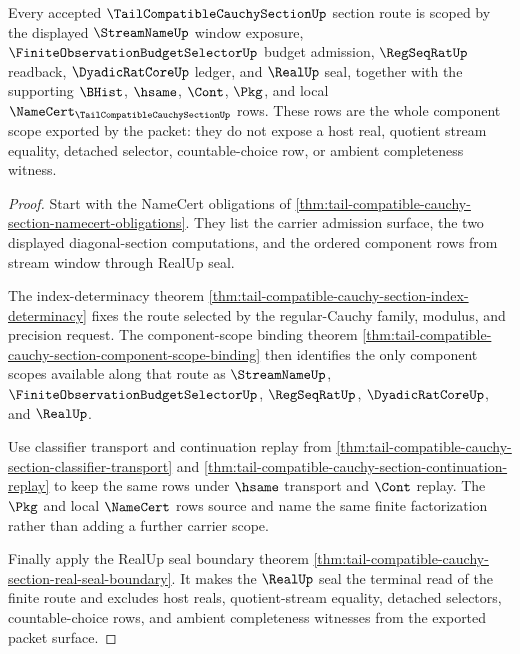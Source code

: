 \begin{theorem}
\label{thm:tail-compatible-cauchy-section-scoped-component-readiness}
Every accepted $\TailCompatibleCauchySectionUp$ section route is scoped by the displayed $\StreamNameUp$ window exposure, $\FiniteObservationBudgetSelectorUp$ budget admission, $\RegSeqRatUp$ readback, $\DyadicRatCoreUp$ ledger, and $\RealUp$ seal, together with the supporting $\BHist$, $\hsame$, $\Cont$, $\Pkg$, and local $\NameCert_{\TailCompatibleCauchySectionUp}$ rows. These rows are the whole component scope exported by the packet: they do not expose a host real, quotient stream equality, detached selector, countable-choice row, or ambient completeness witness.
\end{theorem}
\begin{proof}
Start with the NameCert obligations of \autoref{thm:tail-compatible-cauchy-section-namecert-obligations}. They list the carrier admission surface, the two displayed diagonal-section computations, and the ordered component rows from stream window through RealUp seal.

The index-determinacy theorem \autoref{thm:tail-compatible-cauchy-section-index-determinacy} fixes the route selected by the regular-Cauchy family, modulus, and precision request. The component-scope binding theorem \autoref{thm:tail-compatible-cauchy-section-component-scope-binding} then identifies the only component scopes available along that route as $\StreamNameUp$, $\FiniteObservationBudgetSelectorUp$, $\RegSeqRatUp$, $\DyadicRatCoreUp$, and $\RealUp$.

Use classifier transport and continuation replay from \autoref{thm:tail-compatible-cauchy-section-classifier-transport} and \autoref{thm:tail-compatible-cauchy-section-continuation-replay} to keep the same rows under $\hsame$ transport and $\Cont$ replay. The $\Pkg$ and local $\NameCert$ rows source and name the same finite factorization rather than adding a further carrier scope.

Finally apply the RealUp seal boundary theorem \autoref{thm:tail-compatible-cauchy-section-real-seal-boundary}. It makes the $\RealUp$ seal the terminal read of the finite route and excludes host reals, quotient-stream equality, detached selectors, countable-choice rows, and ambient completeness witnesses from the exported packet surface.
\end{proof}

